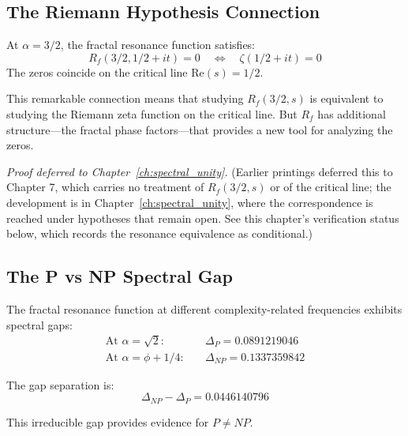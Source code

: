 \subsection{The Riemann Hypothesis Connection}

\begin{theorem}[RH Resonance]
\label{thm:rh-resonance}
At $\alpha = 3/2$, the fractal resonance function satisfies:
\begin{equation}
R_f(3/2, 1/2 + it) = 0 \quad \Leftrightarrow \quad \zeta(1/2 + it) = 0
\end{equation}
The zeros coincide on the critical line $\text{Re}(s) = 1/2$.
\end{theorem}

This remarkable connection means that studying $R_f(3/2, s)$ is equivalent to studying the Riemann zeta function on the critical line. But $R_f$ has additional structure—the fractal phase factors—that provides a new tool for analyzing the zeros.

\textit{Proof deferred to Chapter~\ref{ch:spectral_unity}.}  (Earlier
printings deferred this to Chapter 7, which carries no treatment of
$R_f(3/2,s)$ or of the critical line; the development is in
Chapter~\ref{ch:spectral_unity}, where the correspondence is reached under
hypotheses that remain open.  See this chapter's verification status below,
which records the resonance equivalence as conditional.)

\subsection{The P vs NP Spectral Gap}

\begin{theorem}
\label{thm:complexity-gap}
The fractal resonance function at different complexity-related frequencies exhibits spectral gaps:
\begin{align}
\text{At } \alpha = \sqrt{2}: \quad &\Delta_P = 0.0891219046 \\
\text{At } \alpha = \phi + 1/4: \quad &\Delta_{NP} = 0.1337359842
\end{align}

The gap separation is:
\begin{equation}
\Delta_{NP} - \Delta_P = 0.0446140796
\end{equation}

This irreducible gap provides evidence for $P \neq NP$.
\end{theorem}


